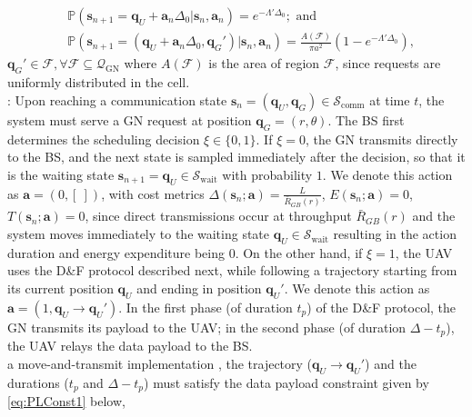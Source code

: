 \documentclass[10pt, twocolumn]{IEEEtran}
\theoremstyle{plain}
\theoremstyle{definition}
\theoremstyle{remark}
\begin{document}
\begin{align*}
    &\mathbb{P}(\mathbf{s}_{n{+}1}{=}\mathbf{q}_{U}{+}\mathbf{a}_{n}\Delta_{0}{|}\mathbf{s}_{n},\mathbf{a}_{n}){=}e^{{-}\Lambda'\Delta_{0}};\text{ and}\\
    &\mathbb{P}(\mathbf{s}_{n{+}1}{=}(\mathbf{q}_{U}{+}\mathbf{a}_{n}\Delta_{0},\mathbf{q}_{G}'){|}\mathbf{s}_{n},\mathbf{a}_{n}){=}\frac{A(\mathcal{F})}{\pi a^{2}}(1{-}e^{{-}\Lambda'\Delta_{0}}),
\end{align*}
$\mathbf{q}_{G}'{\in}\mathcal{F},{\forall}\mathcal{F}{\subseteq}\mathcal{Q}_{\mathrm{GN}}$ where $A(\mathcal{F})$ is the area of region $\mathcal{F}$, since requests are uniformly distributed in the cell.\\
:
Upon reaching a communication state $\mathbf{s}_{n}{=}(\mathbf{q}_{U},\mathbf{q}_{G}){\in}\mathcal{S}_{\mathrm{comm}}$ at time $t$, the system must serve a GN request at position $\mathbf{q}_{G}{=}(r,\theta)$. The BS first determines the scheduling decision $\xi{\in}\{0,1\}$. If $\xi{=}0$, the GN transmits directly to the BS, and the next state is sampled immediately after the decision, so that it is the waiting state $\mathbf{s}_{n{+}1}{=}\mathbf{q}_{U}{\in}\mathcal{S}_{\mathrm{wait}}$ with probability $1$. We denote this action as $\mathbf{a}{=}(0,[\ ])$, with cost metrics $\Delta(\mathbf{s}_{n};\mathbf{a}){=}\frac{L}{\bar R_{GB}(r)}$, $E(\mathbf{s}_{n};\mathbf{a}){=}0$, $T(\mathbf{s}_{n};\mathbf{a}){=}0$, since direct transmissions occur at throughput $\bar{R}_{GB}(r)$ and the system moves immediately to the waiting state $\mathbf{q}_{U}{\in}\mathcal{S}_{\mathrm{wait}}$ resulting in the action duration and energy expenditure being $0$. On the other hand, if $\xi{=}1$, the UAV uses the D\&F protocol described next, while following a trajectory starting from its current position $\mathbf{q}_{U}$ and ending in position $\mathbf{q}_{U}'$. We denote this action as $\mathbf{a}{=}(1,\mathbf{q}_{U}{\rightarrow}{\mathbf{q}}_{U}')$. In the first phase (of duration $t_{p}$) of the D\&F protocol, the GN transmits its payload to the UAV; in the second phase (of duration $\Delta{-}t_{p}$), the UAV relays the data payload to the BS.\\
 a {move-and-transmit} implementation \cite{SCA}, the trajectory ($\mathbf{q}_{U}{\rightarrow}{\mathbf{q}}_{U}'$) and the durations ($t_{p}$ and $\Delta{-}t_{p}$) must satisfy
the data payload constraint given by \eqref{eq:PLConst1} below,
\end{document}
